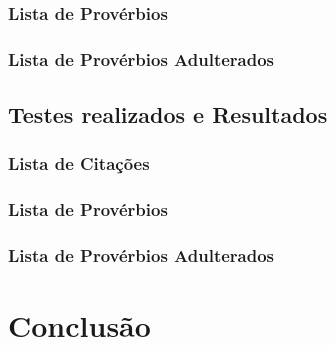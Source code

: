 \documentclass[11pt,a4paper]{report}
\begin{document}
\subsection{Lista de Provérbios}


\subsection{Lista de Provérbios Adulterados}


\section{Testes realizados e Resultados}
\subsection{Lista de Citações}


\subsection{Lista de Provérbios}


\subsection{Lista de Provérbios Adulterados}


\chapter{Conclusão}
\label{chap:concl}
\end{document}

